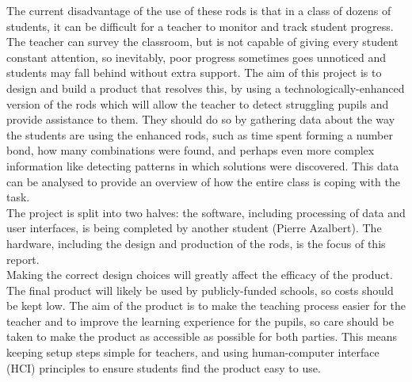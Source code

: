 The current disadvantage of the use of these rods is that in a class of dozens of students, it can be difficult for a teacher to monitor and track student progress. The teacher can survey the classroom, but is not capable of giving every student constant attention, so inevitably, poor progress sometimes goes unnoticed and students may fall behind without extra support. The aim of this project is to design and build a product that resolves this, by using a technologically-enhanced version of the rods which will allow the teacher to detect struggling pupils and provide assistance to them. They should do so by gathering data about the way the students are using the enhanced rods, such as time spent forming a number bond, how many combinations were found, and perhaps even more complex information like detecting patterns in which solutions were discovered. This data can be analysed to provide an overview of how the entire class is coping with the task.\\

The project is split into two halves: the software, including processing of data and user interfaces, is being completed by another student (Pierre Azalbert). The hardware, including the design and production of the rods, is the focus of this report.\\

Making the correct design choices will greatly affect the efficacy of the product. The final product will likely be used by publicly-funded schools, so costs should be kept low. The aim of the product is to make the teaching process easier for the teacher and to improve the learning experience for the pupils, so care should be taken to make the product as accessible as possible for both parties. This means keeping setup steps simple for teachers, and using human-computer interface (HCI) principles to ensure students find the product easy to use.

